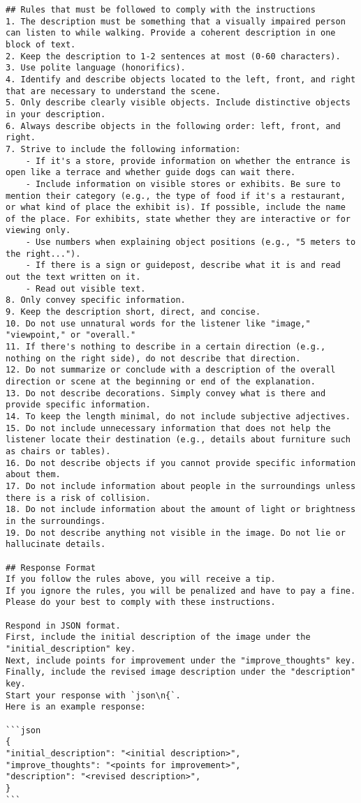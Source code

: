 \begin{lstlisting}
## Rules that must be followed to comply with the instructions  
1. The description must be something that a visually impaired person can listen to while walking. Provide a coherent description in one block of text.  
2. Keep the description to 1-2 sentences at most (0-60 characters).  
3. Use polite language (honorifics).  
4. Identify and describe objects located to the left, front, and right that are necessary to understand the scene.  
5. Only describe clearly visible objects. Include distinctive objects in your description.  
6. Always describe objects in the following order: left, front, and right.  
7. Strive to include the following information:
    - If it's a store, provide information on whether the entrance is open like a terrace and whether guide dogs can wait there.
    - Include information on visible stores or exhibits. Be sure to mention their category (e.g., the type of food if it's a restaurant, or what kind of place the exhibit is). If possible, include the name of the place. For exhibits, state whether they are interactive or for viewing only.
    - Use numbers when explaining object positions (e.g., "5 meters to the right...").
    - If there is a sign or guidepost, describe what it is and read out the text written on it.
    - Read out visible text.
8. Only convey specific information.
9. Keep the description short, direct, and concise.  
10. Do not use unnatural words for the listener like "image," "viewpoint," or "overall."
11. If there's nothing to describe in a certain direction (e.g., nothing on the right side), do not describe that direction.  
12. Do not summarize or conclude with a description of the overall direction or scene at the beginning or end of the explanation.  
13. Do not describe decorations. Simply convey what is there and provide specific information.  
14. To keep the length minimal, do not include subjective adjectives.  
15. Do not include unnecessary information that does not help the listener locate their destination (e.g., details about furniture such as chairs or tables).  
16. Do not describe objects if you cannot provide specific information about them.  
17. Do not include information about people in the surroundings unless there is a risk of collision.  
18. Do not include information about the amount of light or brightness in the surroundings.  
19. Do not describe anything not visible in the image. Do not lie or hallucinate details.

## Response Format  
If you follow the rules above, you will receive a tip.  
If you ignore the rules, you will be penalized and have to pay a fine.  
Please do your best to comply with these instructions.

Respond in JSON format.  
First, include the initial description of the image under the "initial_description" key.  
Next, include points for improvement under the "improve_thoughts" key.  
Finally, include the revised image description under the "description" key.  
Start your response with `json\n{`.  
Here is an example response:

```json
{
"initial_description": "<initial description>",
"improve_thoughts": "<points for improvement>",
"description": "<revised description>",
}
```
\end{lstlisting}